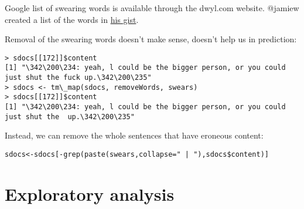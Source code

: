 \documentclass{article}
\begin{document}
Google list of swearing words is available through the dwyl.com website. @jamiew created a list of the words in \href{https://gist.github.com/jamiew/1112488}{his gist}.

Removal of the swearing words doesn't make sense, doesn't help us in prediction:

\begin{lstlisting}
> sdocs[[172]]$content
[1] "\342\200\234: yeah, l could be the bigger person, or you could just shut the fuck up.\342\200\235"
> sdocs <- tm\_map(sdocs, removeWords, swears)
> sdocs[[172]]$content
[1] "\342\200\234: yeah, l could be the bigger person, or you could just shut the  up.\342\200\235"
\end{lstlisting}

Instead, we can remove the whole sentences that have eroneous content:

\begin{lstlisting}
sdocs<-sdocs[-grep(paste(swears,collapse=" | "),sdocs$content)]
\end{lstlisting}


\section{Exploratory analysis}
\end{document}
